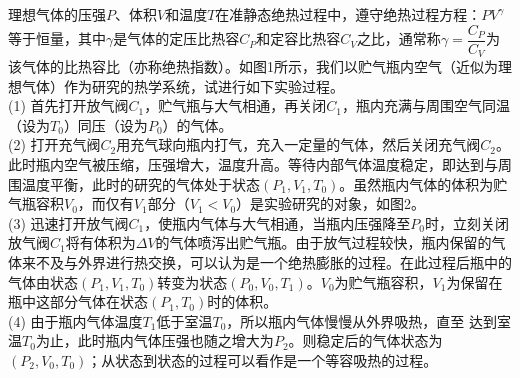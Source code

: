 \documentclass[11pt]{article}
\begin{document}
理想气体的压强$P$、体积$V$和温度$T$在准静态绝热过程中，遵守绝热过程方程：$PV^\gamma$等于恒量，其中$\gamma$是气体的定压比热容$C_P$和定容比热容$C_V$之比，通常称$\gamma=\dfrac{C_P}{C_V}$为该气体的比热容比（亦称绝热指数）。如图1所示，我们以贮气瓶内空气（近似为理想气体）作为研究的热学系统，试进行如下实验过程。\\
(1) 首先打开放气阀$C_1$，贮气瓶与大气相通，再关闭$C_1$，瓶内充满与周围空气同温（设为$T_0$）同压（设为$P_0$）的气体。\\
(2) 打开充气阀$C_2$用充气球向瓶内打气，充入一定量的气体，然后关闭充气阀$C_2$。此时瓶内空气被压缩，压强增大，温度升高。等待内部气体温度稳定，即达到与周围温度平衡，此时的研究的气体处于状态\uppercase\expandafter{}$(P_1,V_1,T_0)$。虽然瓶内气体的体积为贮气瓶容积$V_0$，而仅有$V_1$部分（$V_1<V_0$）是实验研究的对象，如图2。\\
(3) 迅速打开放气阀$C_1$，使瓶内气体与大气相通，当瓶内压强降至$P_0$时，立刻关闭放气阀$C_1$将有体积为$\Delta V$的气体喷泻出贮气瓶。由于放气过程较快，瓶内保留的气体来不及与外界进行热交换，可以认为是一个绝热膨胀的过程。在此过程后瓶中的气体由状态\uppercase\expandafter{}$(P_1,V_1,T_0)$转变为状态\uppercase\expandafter{}$(P_0,V_0,T_1)$。$V_0$为贮气瓶容积，$V_1$为保留在瓶中这部分气体在状态\uppercase\expandafter{}$(P_1,T_0)$时的体积。\\
(4) 由于瓶内气体温度$T_1$低于室温$T_0$，所以瓶内气体慢慢从外界吸热，直至 达到室温$T_0$为止，此时瓶内气体压强也随之增大为$P_2$。则稳定后的气体状态为\uppercase\expandafter{}$(P_2,V_0,T_0)$；从状态\uppercase\expandafter{}到状态\uppercase\expandafter{}的过程可以看作是一个等容吸热的过程。
\end{document}
